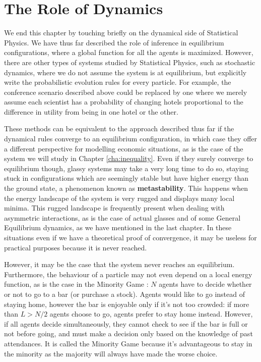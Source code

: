 \section{The Role of Dynamics}

We end this chapter by touching briefly on the dynamical side of Statistical Physics. We have thus far described the role of inference in equilibrium configurations, where a global function for all the agents is maximized. However, there are other types of systems studied by Statistical Physics, such as stochastic dynamics, where we do not assume the system is at equilibrium, but explicitly write the probabilistic evolution rules for every particle. For example, the conference scenario described above could be replaced by one where we merely assume each scientist has a probability of changing hotels proportional to the difference in utility from being in one hotel or the other.

These methods can be equivalent to the approach described thus far if the dynamical rules converge to an equilibrium configuration, in which case they offer a different perspective for modelling economic situations, as is the case of the system we will study in Chapter \ref{cha:inequality}. Even if they surely converge to equilibrium though, glassy systems may take a very long time to do so, staying stuck in configurations which are seemingly stable but have higher energy than the ground state, a phenomenon known as \textbf{metastability}. This happens when the energy landscape of the system is very rugged and displays many local minima. This rugged landscape is frequently present when dealing with asymmetric interactions, as is the case of actual glasses and of some General Equilibrium dynamics, as we have mentioned in the last chapter. In these situations even if we have a theoretical proof of convergence, it may be useless for practical purposes because it is never reached.

However, it may be the case that the system never reaches an equilibrium. Furthermore, the behaviour of a particle may not even depend on a local energy function, as is the case in the Minority Game \cite{MinorityGames}: $N$ agents have to decide whether or not to go to a bar (or purchase a stock). Agents would like to go instead of staying home, however the bar is enjoyable only if it's not too crowded: if more than $L > N/2$ agents choose to go, agents prefer to stay home instead. However, if all agents decide simultaneously, they cannot check to see if the bar is full or not before going, and must make a decision only based on the knowledge of past attendances. It is called the Minority Game because it's advantageous to stay in the minority as the majority will always have made the worse choice. 

